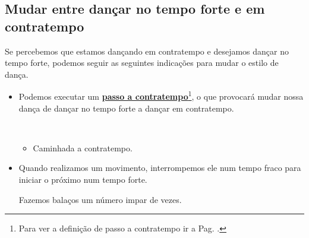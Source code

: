 \subsection{Mudar entre dançar no tempo forte e em contratempo}
Se percebemos  que estamos dançando em contratempo e desejamos dançar no tempo forte,
podemos seguir as seguintes indicações para mudar o estilo de dança.
\begin{itemize}
\item Podemos executar um \hyperref[def:PassoAContratempo]{\textbf{passo a contratempo}}\footnote{ Para 
ver a definição de passo a contratempo ir a Pag. \pageref{def:PassoAContratempo}.},
o que provocará mudar nossa dança de dançar no tempo forte a dançar em contratempo.
\begin{example}~
\begin{itemize}
\item Caminhada a contratempo.
\end{itemize}
\end{example}
\item Quando realizamos um movimento, interrompemos ele num tempo fraco 
para iniciar o próximo num tempo forte.
\begin{example}
Fazemos balaços um número impar de vezes.
\end{example}
\end{itemize}



